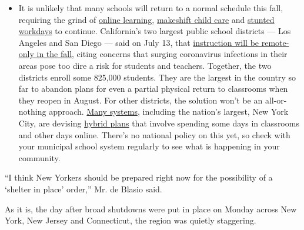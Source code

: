\begin{itemize}
  \begin{itemize}
  \tightlist
  \item
    It is unlikely that many schools will return to a normal schedule
    this fall, requiring the grind of
    \href{https://www.nytimes.com/2020/06/05/us/coronavirus-education-lost-learning.html?action=click\&pgtype=Article\&state=default\&region=MAIN_CONTENT_3\&context=storylines_faq}{online
    learning},
    \href{https://www.nytimes.com/2020/05/29/us/coronavirus-child-care-centers.html?action=click\&pgtype=Article\&state=default\&region=MAIN_CONTENT_3\&context=storylines_faq}{makeshift
    child care} and
    \href{https://www.nytimes.com/2020/06/03/business/economy/coronavirus-working-women.html?action=click\&pgtype=Article\&state=default\&region=MAIN_CONTENT_3\&context=storylines_faq}{stunted
    workdays} to continue. California's two largest public school
    districts --- Los Angeles and San Diego --- said on July 13, that
    \href{https://www.nytimes.com/2020/07/13/us/lausd-san-diego-school-reopening.html?action=click\&pgtype=Article\&state=default\&region=MAIN_CONTENT_3\&context=storylines_faq}{instruction
    will be remote-only in the fall}, citing concerns that surging
    coronavirus infections in their areas pose too dire a risk for
    students and teachers. Together, the two districts enroll some
    825,000 students. They are the largest in the country so far to
    abandon plans for even a partial physical return to classrooms when
    they reopen in August. For other districts, the solution won't be an
    all-or-nothing approach.
    \href{https://bioethics.jhu.edu/research-and-outreach/projects/eschool-initiative/school-policy-tracker/}{Many
    systems}, including the nation's largest, New York City, are
    devising
    \href{https://www.nytimes.com/2020/06/26/us/coronavirus-schools-reopen-fall.html?action=click\&pgtype=Article\&state=default\&region=MAIN_CONTENT_3\&context=storylines_faq}{hybrid
    plans} that involve spending some days in classrooms and other days
    online. There's no national policy on this yet, so check with your
    municipal school system regularly to see what is happening in your
    community.
  \end{itemize}
\end{itemize}

``I think New Yorkers should be prepared right now for the possibility
of a `shelter in place' order,'' Mr. de Blasio said.

As it is, the day after broad shutdowns were put in place on Monday
across New York, New Jersey and Connecticut, the region was quietly
staggering.

